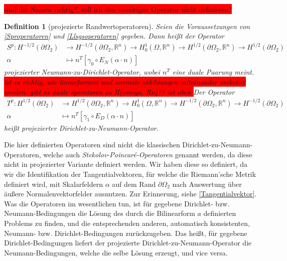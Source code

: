 \documentclass[bibliography=totoc,12pt,a4paper]{scrartcl}
\theoremstyle{exampstyle}
\newtheorem{defi}{Definition}%
\numberwithin{equation}{section}
\begin{document}
\colorbox{red}{sind die Namen richtig?, soll ich den unnötigen Operator nicht definieren?}

\begin{defi}[projezierte Randwertoperatoren]\label{Randoperatoren}
Seien die Voraussetzungen von \ref{Sproperatoren} und \ref{Llsgsoperatoren} gegeben. Dann heißt der Operator
\begin{align*}
	S^p: H^{-1/2}(\partial\Omega_2) &\rightarrow H^{-1/2}(\partial\Omega_2, \mathbb{R}^n) \rightarrow H^1_0(\Omega,\mathbb{R}^n) \rightarrow H^{1/2}(\partial\Omega_2, \mathbb{R}^n) \rightarrow H^{1/2}(\partial\Omega_2) \\
	\alpha &\mapsto n^T[\gamma_0 \circ E_N(\alpha \cdot n)]
\end{align*}
\textit{projezierter Neumann-zu-Dirichlet-Operator}, wobei $n^T$ eine duale Paarung meint.
\colorbox{red}{ist es richtig, wie linearformen und normale abbildungen miteinander verkettet werden. gibt es duale operatoren zu H(omega, Rn)?? ist oben  }
Der Operator
\begin{align*}
	T^p: H^{1/2}(\partial\Omega_2) &\rightarrow H^{1/2}(\partial\Omega_2,\mathbb{R}^n) \rightarrow H^1_0(\Omega,\mathbb{R}^n) \rightarrow H^{-1/2}(\partial\Omega_2,\mathbb{R}^n) \rightarrow H^{-1/2}(\partial\Omega_2) \\
	\alpha &\mapsto n^T[\gamma_1 \circ E_D(\alpha \cdot n)]
\end{align*}
heißt \textit{projezierter Dirichlet-zu-Neumann-Operator}.
\end{defi}



Die hier definierten Operatoren sind nicht die klassischen Dirichlet-zu-Neumann-Operatoren, welche auch \textit{Stekolov-Poincaré-Operatoren} genannt werden, da diese nicht in projezierter Variante definiert werden. Wir haben diese so definiert, da wir die Identifikation der Tangentialvektoren, für welche die Riemann'sche Metrik definiert wird, mit Skalarfeldern $\alpha$ auf dem Rand $\partial\Omega_2$ nach Auswertung über äußere Normalenvektorfelder ausnutzen. Zur Erinnerung, siehe \ref{Tangentialvektor}. Was die Operatoren im wesentlichen tun, ist für gegebene Dirichlet- bzw. Neumann-Bedingungen die Lösung des durch die Bilinearform $a$ definierten Problems zu finden, und die entsprechenden anderen, automatisch konsistenten, Neumann- bzw. Dirichlet-Bedingungen zurückzugeben. Das heißt, für gegebene Dirichlet-Bedingungen liefert der projezierte Dirichlet-zu-Neumann-Operator die Neumann-Bedingungen, welche die selbe Lösung erzeugt, und vice versa.
\end{document}

